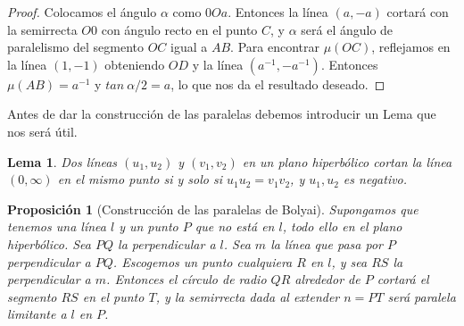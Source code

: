 \documentclass[a4paper]{amsart}
\theoremstyle{plain}
\newtheorem{lemma}{Lema}
\newtheorem{proposition}{Proposición}
\begin{document}
\begin{proof}
Colocamos el ángulo $\alpha$ como $0Oa$. Entonces la línea $(a,-a)$ cortará con la semirrecta $O0$ con ángulo recto en el punto $C$, y $\alpha$ será el ángulo de paralelismo del segmento $OC$ igual a $AB$. Para encontrar $\mu(OC)$, reflejamos en la línea $(1,-1)$ obteniendo $OD$ y la línea $(a^{-1},-a^{-1})$. Entonces $\mu(AB)=a^{-1}$ y $tan\:\alpha/2=a$, lo que nos da el resultado deseado.
\end{proof}

Antes de dar la construcción de las paralelas debemos introducir un Lema que nos será útil.

\begin{lemma}
Dos líneas $(u_1,u_2)$ y $(v_1,v_2)$ en un plano hiperbólico cortan la línea $(0,\infty)$ en el mismo punto si y solo si $u_1u_2=v_1v_2$, y $u_1,u_2$ es negativo.
\end{lemma}

\begin{proposition}[Construcción de las paralelas de Bolyai]
Supongamos que tenemos una línea $l$ y un punto $P$ que no está en $l$, todo ello en el plano hiperbólico. Sea $PQ$ la perpendicular a $l$. Sea $m$ la línea que pasa por $P$ perpendicular a $PQ$.
Escogemos un punto cualquiera $R$ en $l$, y sea $RS$ la perpendicular a $m$. Entonces el círculo de radio $QR$ alrededor de $P$ cortará el segmento $RS$ en el punto $T$, y la semirrecta dada al extender $n=PT$ será paralela limitante a $l$ en $P$. 
\end{proposition}
\end{document}
